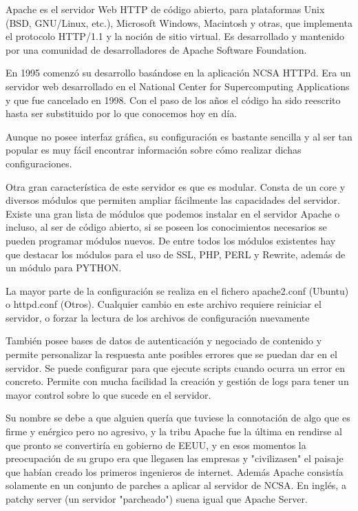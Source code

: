 Apache es el servidor Web HTTP de código abierto, para plataformas Unix (BSD, GNU/Linux, etc.), Microsoft Windows, Macintosh y otras, que implementa el protocolo HTTP/1.1 y la noción de sitio virtual.  Es desarrollado y mantenido por una comunidad de desarrolladores de Apache Software Foundation.


En 1995 comenzó su desarrollo basándose en la aplicación NCSA HTTPd. Era un servidor web desarrollado en el National Center for Supercomputing Applications y que fue cancelado en 1998. Con el paso de los años el código ha sido reescrito hasta ser substituido por lo que conocemos hoy en día.


Aunque no posee interfaz gráfica, su configuración es bastante sencilla y al ser tan popular es muy fácil encontrar información sobre cómo realizar dichas configuraciones. 

Otra gran característica de este servidor es que es modular. Consta de un core y diversos módulos que permiten ampliar fácilmente las capacidades del servidor. Existe una gran lista de módulos que podemos instalar en el servidor Apache o incluso, al ser de código abierto, si se poseen los conocimientos necesarios se pueden programar módulos nuevos. De entre todos los módulos existentes hay que destacar los módulos para el uso de SSL, PHP, PERL y Rewrite, además de un módulo para PYTHON. 

La mayor parte de la configuración se realiza en el fichero apache2.conf (Ubuntu) o httpd.conf (Otros). Cualquier cambio en este archivo requiere reiniciar el servidor, o forzar la lectura de los archivos de configuración nuevamente

También posee bases de datos de autenticación y negociado de contenido y permite personalizar la respuesta ante posibles errores que se puedan dar en el servidor. Se puede configurar para que ejecute scripts cuando ocurra un error en concreto. Permite con mucha facilidad la creación y gestión de logs para tener un mayor control sobre lo que sucede en el servidor.


Su nombre se debe a que alguien quería que tuviese la connotación de algo que es firme y enérgico pero no agresivo, y la tribu Apache fue la última en rendirse al que pronto se convertiría en gobierno de EEUU, y en esos momentos la preocupación de su grupo era que llegasen las empresas y "civilizasen" el paisaje que habían creado los primeros ingenieros de internet. Además Apache consistía solamente en un conjunto de parches a aplicar al servidor de NCSA. En inglés, a patchy server (un servidor "parcheado") suena igual que Apache Server.



